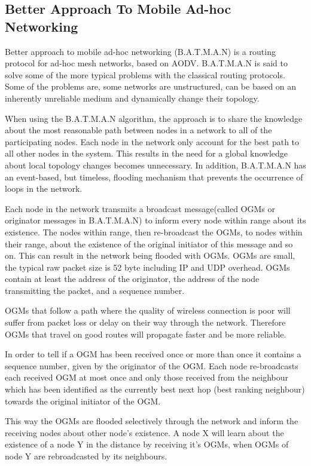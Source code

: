 \subsection{Better Approach To Mobile Ad-hoc Networking}
Better approach to mobile ad-hoc networking (B.A.T.M.A.N) is a routing protocol for ad-hoc mesh networks, based on AODV. 
B.A.T.M.A.N is said to solve some of the more typical problems with the classical routing protocols.
Some of the problems are, some networks are unstructured, can be based on an inherently unreliable medium and dynamically change their topology\cite{BATMAN}.

When using the B.A.T.M.A.N algorithm, the approach is to share the knowledge about the most reasonable path between nodes in a network to all of the participating nodes.
Each node in the network only account for the best path to all other nodes in the system.
This results in the need for a global knowledge about local topology changes becomes unnecessary.
In addition, B.A.T.M.A.N has an event-based, but timeless, flooding mechanism that prevents the occurrence of loops in the network.

Each node in the network transmits a broadcast message(called OGMs or originator messages in B.A.T.M.A.N) to inform every node within range about its existence.
The nodes within range, then re-broadcast the OGMs, to nodes within their range, about the existence of the original initiator of this message and so on.
This can result in the network being flooded with OGMs.
OGMs are small, the typical raw packet size is 52 byte including IP and UDP overhead\cite{BATMAN}.
OGMs contain at least the address of the originator, the address of the node transmitting the packet, and a sequence number.

OGMs that follow a path where the quality of wireless connection is poor will suffer from packet loss or delay on their way through the network.
Therefore OGMs that travel on good routes will propagate faster and be more reliable\cite{BATMAN}.

In order to tell if a OGM has been received once or more than once it contains a sequence number, given by the originator of the OGM.
Each node re-broadcasts each received OGM at most once and only those received from the neighbour which has been identified as the currently best next hop (best ranking neighbour) towards the original initiator of the OGM.

This way the OGMs are flooded selectively through the network and inform the receiving nodes about other node's existence. 
A node X will learn about the existence of a node Y in the distance by receiving it's OGMs, when OGMs of node Y are rebroadcasted by its neighbours.

